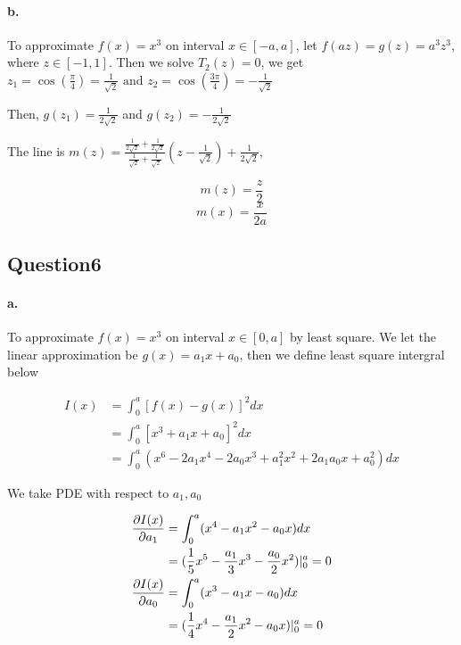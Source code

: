 \documentclass{article}
\begin{document}
\paragraph{b.} To approximate $f(x) = x^3$ on interval $x \in [-a,a]$, let $ f(az) = g(z) = a^3 z^3$, where $z \in [-1,1]$.
Then we solve $T_2(z) = 0$, we get $z_1 = \cos (\frac{\pi}{4}) = \frac{1}{\sqrt{2}} \text{ and } z_2 = \cos (\frac{3\pi}{4}) = - \frac{1}{\sqrt{2}}$

Then, $g(z_1) = \frac{1}{2 \sqrt{2}} $ and $g(z_2) = - \frac{1}{2 \sqrt{2}} $

The line is $ m(z) = \frac{\frac{1}{2 \sqrt{2}} + \frac{1}{2\sqrt{2}}}{\frac{1}{\sqrt{2}} + \frac{1}{\sqrt{2}}} (z - \frac{1}{\sqrt{2}} ) + \frac{1}{2 \sqrt{2}} $,

$$ m(z) = \frac{z}{2} $$
$$ m(x) = \frac{x}{2a}$$


\subsection*{Question6}
\paragraph{a. } To approximate $f(x) = x^3$ on interval $x \in [0,a]$ by least square.
We let the linear approximation be $g(x) = a_1 x + a_0$, then we define least square intergral below

\begin{equation}
  \begin{split}
    I(x) &= \int^{a}_{0}[f(x)-g(x)]^2 dx\\
    &= \int^{a}_{0}[x^3 + a_1 x + a_0]^2 dx\\
    &= \int^{a}_{0}( x^6 - 2 a_1 x^4 -2 a_0 x^3 +a_{1}^{2} x^2 + 2 a_1 a_0 x + a^{2}_{0})dx
  \end{split}
\end{equation}

We take PDE with respect to $ a_1, a_0$

\begin{equation}
  \begin{split}
    \pdv{I(x)}{a_1} &= \int^{a}_{0} (x^4 - a_1 x^2 - a_0 x) dx  \\
    &= (\frac{1}{5} x^5 - \frac{a_1}{3} x ^3 - \frac{a_0}{2} x^2) \vert^{a}_{0} =0\\
    \pdv{I(x)}{a_0} &= \int^{a}_{0} (x^3 - a_1 x - a_0) dx  \\
    &= (\frac{1}{4} x^4 - \frac{a_1}{2} x^2 - a_0 x) \vert^{a}_{0} = 0\\
  \end{split}
\end{equation}
\end{document}
